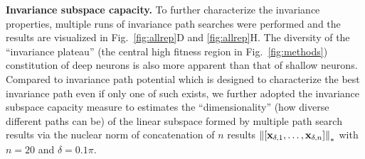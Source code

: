 \documentclass[10pt,twocolumn,letterpaper]{article}
\begin{document}

{\bf Invariance subspace capacity.} To further characterize the invariance properties, multiple runs of invariance path searches {were} performed and the results are visualized in Fig.~\ref{fig:allrep}D and \ref{fig:allrep}H.
The diversity of the ``invariance plateau'' (\eg the central high fitness region in Fig.~\ref{fig:methods}) constitution of deep neurons is also more apparent than that of shallow neurons.
Compared to invariance path potential which is designed to characterize the best invariance path even if only one of such exists, we further adopted the invariance subspace capacity measure to estimates the ``dimensionality'' (\ie how diverse different paths can be) of the linear subspace formed by multiple path search results via the nuclear norm of concatenation of $n$ results $\left\|\left[{\bf{x}}_{\delta,1},\dots,{\bf{x}}_{\delta,n}\right]\right\|_{*}$ with $n=20$ and $\delta=0.1\pi$.


\newcommand{\defstars}{In this paper, significance levels follow the definition that *, ** and *** correspond to $p<0.05$, $p<0.01$ and $p<0.001$ respectively.}
\end{document}
